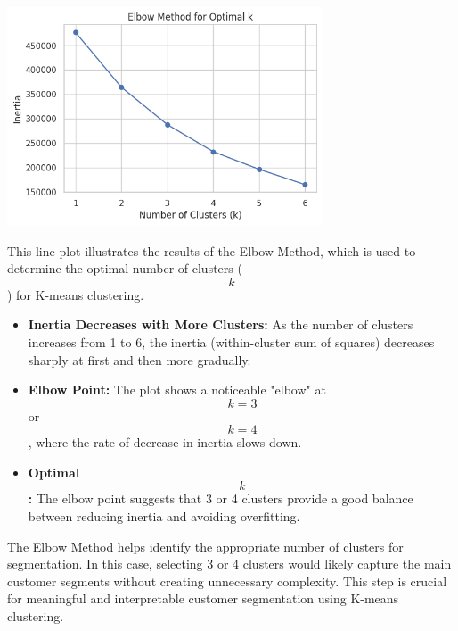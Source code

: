 \documentclass[a4paper]{article}
\begin{document}
\begin{multicols}{2}
\noindent
\begin{minipage}{\columnwidth}
\centering
\includegraphics[width=0.7\textwidth]{plots/Elbow Method for Optimal k.png}
\label{fig:elbow_method}
\end{minipage}

This line plot illustrates the results of the Elbow Method, which is used to determine the optimal number of clusters ($$k$$) for K-means clustering.

\begin{itemize}
    \item \textbf{Inertia Decreases with More Clusters:} As the number of clusters increases from 1 to 6, the inertia (within-cluster sum of squares) decreases sharply at first and then more gradually.
    \item \textbf{Elbow Point:} The plot shows a noticeable "elbow" at $$k = 3$$ or $$k = 4$$, where the rate of decrease in inertia slows down.
    \item \textbf{Optimal $$k$$:} The elbow point suggests that 3 or 4 clusters provide a good balance between reducing inertia and avoiding overfitting.
\end{itemize}

The Elbow Method helps identify the appropriate number of clusters for segmentation. In this case, selecting 3 or 4 clusters would likely capture the main customer segments without creating unnecessary complexity. This step is crucial for meaningful and interpretable customer segmentation using K-means clustering.





\end{multicols}
\end{document}
